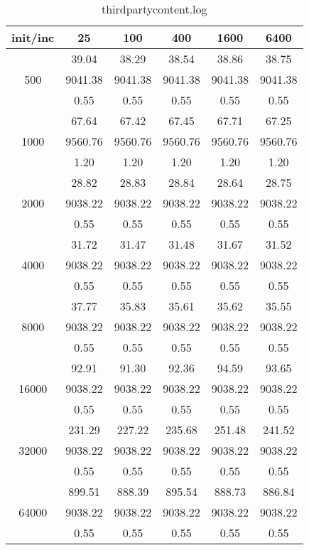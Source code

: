 \begin{table}[th]
\caption{thirdpartycontent.log}
\label{tab:thirdpartycontent.log}
\centering
\begin{tabular}{|c||c|c|c|c|c|}
\hline
init/inc & 25 & 100 & 400 & 1600 & 6400 \\ \hline \hline
  & 39.04 & 38.29 & 38.54 & 38.86 & 38.75\\ 
500  & 9041.38 & 9041.38 & 9041.38 & 9041.38 & 9041.38\\ 
  & 0.55 & 0.55 & 0.55 & 0.55 & 0.55\\ \hline 
  & 67.64 & 67.42 & 67.45 & 67.71 & 67.25\\ 
1000  & 9560.76 & 9560.76 & 9560.76 & 9560.76 & 9560.76\\ 
  & 1.20 & 1.20 & 1.20 & 1.20 & 1.20\\ \hline 
  & 28.82 & 28.83 & 28.84 & 28.64 & 28.75\\ 
2000  & 9038.22 & 9038.22 & 9038.22 & 9038.22 & 9038.22\\ 
  & 0.55 & 0.55 & 0.55 & 0.55 & 0.55\\ \hline 
  & 31.72 & 31.47 & 31.48 & 31.67 & 31.52\\ 
4000  & 9038.22 & 9038.22 & 9038.22 & 9038.22 & 9038.22\\ 
  & 0.55 & 0.55 & 0.55 & 0.55 & 0.55\\ \hline 
  & 37.77 & 35.83 & 35.61 & 35.62 & 35.55\\ 
8000  & 9038.22 & 9038.22 & 9038.22 & 9038.22 & 9038.22\\ 
  & 0.55 & 0.55 & 0.55 & 0.55 & 0.55\\ \hline 
  & 92.91 & 91.30 & 92.36 & 94.59 & 93.65\\ 
16000  & 9038.22 & 9038.22 & 9038.22 & 9038.22 & 9038.22\\ 
  & 0.55 & 0.55 & 0.55 & 0.55 & 0.55\\ \hline 
  & 231.29 & 227.22 & 235.68 & 251.48 & 241.52\\ 
32000  & 9038.22 & 9038.22 & 9038.22 & 9038.22 & 9038.22\\ 
  & 0.55 & 0.55 & 0.55 & 0.55 & 0.55\\ \hline 
  & 899.51 & 888.39 & 895.54 & 888.73 & 886.84\\ 
64000  & 9038.22 & 9038.22 & 9038.22 & 9038.22 & 9038.22\\ 
  & 0.55 & 0.55 & 0.55 & 0.55 & 0.55\\ \hline 
\end{tabular}
\end{table}

